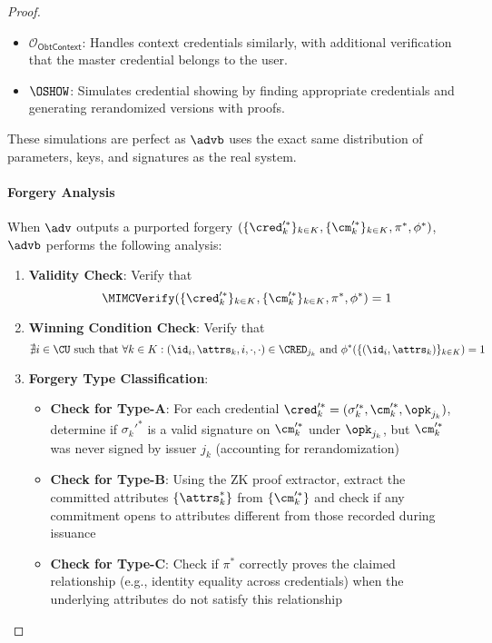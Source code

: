 \begin{proof}
\begin{itemize}
    \item $\mathcal{O}_{\mathsf{ObtContext}}$: Handles context credentials similarly, with additional verification that the master credential belongs to the user.
    
    \item $\OSHOW$: Simulates credential showing by finding appropriate credentials and generating rerandomized versions with proofs.
\end{itemize}

These simulations are perfect as $\advb$ uses the exact same distribution of parameters, keys, and signatures as the real system.

\paragraph{Forgery Analysis}
When $\adv$ outputs a purported forgery $(\{\cred_k'^*\}_{k \in K}, \{\cm_k'^*\}_{k \in K}, \pi^*, \phi^*)$, $\advb$ performs the following analysis:

\begin{enumerate}
    \item \textbf{Validity Check}: Verify that 
    \[
    \MIMCVerify(\{\cred_k'^*\}_{k \in K}, \{\cm_k'^*\}_{k \in K}, \pi^*, \phi^*) = 1
    \]
    
    \item \textbf{Winning Condition Check}: Verify that 
    \[
    \nexists i \in \CU \text{ such that } \forall k \in K: (\id_i, \attrs_k, i, \cdot, \cdot) \in \CRED_{j_k} \text{ and } \phi^*(\{(\id_i, \attrs_k)\}_{k \in K}) = 1
    \]
    
    \item \textbf{Forgery Type Classification}:
    \begin{itemize}
        \item \textbf{Check for Type-A}: For each credential $\cred_k'^* = (\sigma_k'^*, \cm_k'^*, \opk_{j_k})$, determine if $\sigma_k'^*$ is a valid signature on $\cm_k'^*$ under $\opk_{j_k}$, but $\cm_k'^*$ was never signed by issuer $j_k$ (accounting for rerandomization)
        
        \item \textbf{Check for Type-B}: Using the ZK proof extractor, extract the committed attributes $\{\attrs_k^*\}$ from $\{\cm_k'^*\}$ and check if any commitment opens to attributes different from those recorded during issuance
        
        \item \textbf{Check for Type-C}: Check if $\pi^*$ correctly proves the claimed relationship (e.g., identity equality across credentials) when the underlying attributes do not satisfy this relationship
    \end{itemize}
    

\end{enumerate}
\end{proof}
